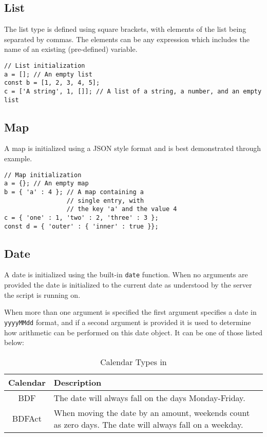 \subsection{List}
The list  type is defined using square brackets, with elements of the list being separated by commas. The elements can be any expression which includes the name of an existing (pre-defined) variable.
\begin{lstlisting}[caption={List initialization}]
// List initialization
a = []; // An empty list
const b = [1, 2, 3, 4, 5];
c = ['A string', 1, []]; // A list of a string, a number, and an empty list
\end{lstlisting}
\subsection{Map}
A map  is initialized using a JSON style format and is best demonstrated through example.
\begin{lstlisting}[caption={Map initialization}]
// Map initialization
a = {}; // An empty map
b = { 'a' : 4 }; // A map containing a
                 // single entry, with
                 // the key 'a' and the value 4
c = { 'one' : 1, 'two' : 2, 'three' : 3 };
const d = { 'outer' : { 'inner' : true }};
\end{lstlisting}
\subsection{Date}
A date  is initialized using the built-in \Verb+date+ function. When no arguments are provided the date is
initialized to the current date as understood by the server the script is running on.

When more than one argument is specified the first argument specifies a date in \Verb+yyyyMMdd+ format, and if a second
argument is provided it is used to determine how arithmetic can be performed on this date object. It can be one of those listed below:

\begin{table}[h!]
\small
\centering
\begin{tabular} { | c | p{7cm} | }
\hline
Calendar & Description \\
\hline
BDF & The date will always fall on the days Monday-Friday. \\
BDFAct & When moving the date by an amount, weekends count as zero days. The date will always fall on a weekday. \\
\hline
\end{tabular}
\label{tab:DateCalendarTypes}
\caption{Calendar Types in \Reflex}
\end{table}

